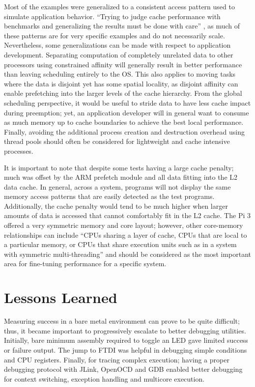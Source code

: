 \documentclass[11pt]{article}
\begin{document}
Most of the examples were generalized to a consistent access pattern used to simulate application behavior.  ``Trying to judge cache performance with benchmarks and generalizing the results must be done with care'' \cite{unix}, as much of these patterns are for very specific examples and do not necessarily scale.  Nevertheless, some generalizations can be made with respect to application development.  Separating computation of completely unrelated data to other processors using constrained affinity will generally result in better performance than leaving scheduling entirely to the OS.  This also applies to moving tasks where the data is disjoint yet has some spatial locality, as disjoint affinity can enable prefetching into the larger levels of the cache hierarchy.  From the global scheduling perspective, it would be useful to stride data to have less cache impact during preemption; yet, an application developer will in general want to consume as much memory up to cache boundaries to achieve the best local performance.  Finally, avoiding the additional process creation and destruction overhead using thread pools should often be considered for lightweight and cache intensive processes.

It is important to note that despite some tests having a large cache penalty; much was offset by the ARM prefetch module and all data fitting into the L2 data cache.  In general, across a system, programs will not display the same memory access patterns that are easily detected as the test programs.  Additionally, the cache penalty would tend to be much higher when larger amounts of data is accessed that cannot comfortably fit in the L2 cache.  The Pi 3 offered a very symmetric memory and core layout; however, other core-memory relationships can include ``CPUs sharing a layer of cache, CPUs that are local to a particular memory, or CPUs that share execution units such as in a system with symmetric multi-threading'' \cite{freebsd} and should be considered as the most important area for fine-tuning performance for a specific system.

\section{Lessons Learned}
\label{sec:lessons}
Measuring success in a bare metal environment can prove to be quite difficult; thus, it became important to progressively escalate to better debugging utilities.  Initially, bare minimum assembly required to toggle an LED gave limited success or failure output.  The jump to FTDI was helpful in debugging simple conditions and CPU registers.  Finally, for tracing complex execution; having a proper debugging protocol with JLink, OpenOCD and GDB enabled better debugging for context switching, exception handling and multicore execution.
\end{document}
